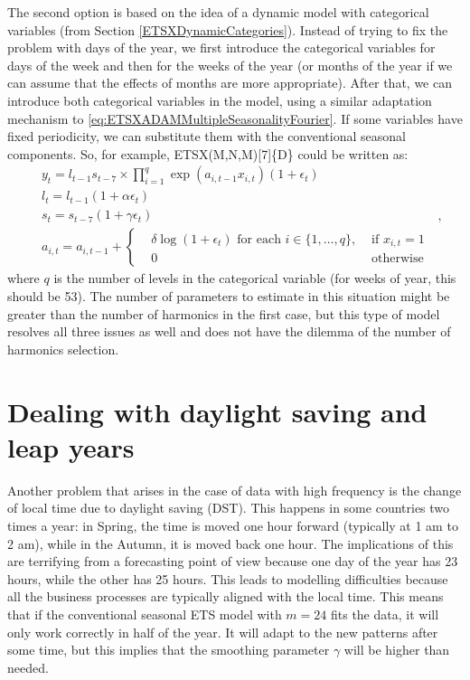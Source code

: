 \documentclass[
]{book}
\theoremstyle{definition}
\theoremstyle{definition}
\theoremstyle{definition}
\theoremstyle{definition}
\theoremstyle{remark}
\begin{document}
The second option is based on the idea of a dynamic model with categorical variables (from Section \ref{ETSXDynamicCategories}). Instead of trying to fix the problem with days of the year, we first introduce the categorical variables for days of the week and then for the weeks of the year (or months of the year if we can assume that the effects of months are more appropriate). After that, we can introduce both categorical variables in the model, using a similar adaptation mechanism to \eqref{eq:ETSXADAMMultipleSeasonalityFourier}. If some variables have fixed periodicity, we can substitute them with the conventional seasonal components. So, for example, ETSX(M,N,M){[}7{]}\{D\} could be written as:
\begin{equation}
  \begin{aligned}
    & {y}_{t} = l_{t-1} s_{t-7} \times \prod_{i=1}^q \exp(a_{i,t-1} x_{i,t}) (1 + \epsilon_t) \\
    & l_t = l_{t-1} (1 + \alpha\epsilon_t) \\
    & s_t = s_{t-7} (1 + \gamma\epsilon_t) \\
    & a_{i,t} = a_{i,t-1} + \left \lbrace \begin{aligned}
      &\delta \log(1+\epsilon_t) \text{ for each } i \in \{1, \dots, q\}, &\text{ if } x_{i,t} = 1 \\
      &0 &\text{ otherwise }
    \end{aligned} \right.
  \end{aligned},
\label{eq:ETSXADAMMultipleSeasonalityCategories}
\end{equation}
where \(q\) is the number of levels in the categorical variable (for weeks of year, this should be 53). The number of parameters to estimate in this situation might be greater than the number of harmonics in the first case, but this type of model resolves all three issues as well and does not have the dilemma of the number of harmonics selection.

\hypertarget{MultipleFrequenciesDSTandLeap}{%
\section{Dealing with daylight saving and leap years}\label{MultipleFrequenciesDSTandLeap}}

Another problem that arises in the case of data with high frequency is the change of local time due to daylight saving (DST). This happens in some countries two times a year: in Spring, the time is moved one hour forward (typically at 1 am to 2 am), while in the Autumn, it is moved back one hour. The implications of this are terrifying from a forecasting point of view because one day of the year has 23 hours, while the other has 25 hours. This leads to modelling difficulties because all the business processes are typically aligned with the local time. This means that if the conventional seasonal ETS model with \(m=24\) fits the data, it will only work correctly in half of the year. It will adapt to the new patterns after some time, but this implies that the smoothing parameter \(\gamma\) will be higher than needed.
\end{document}
